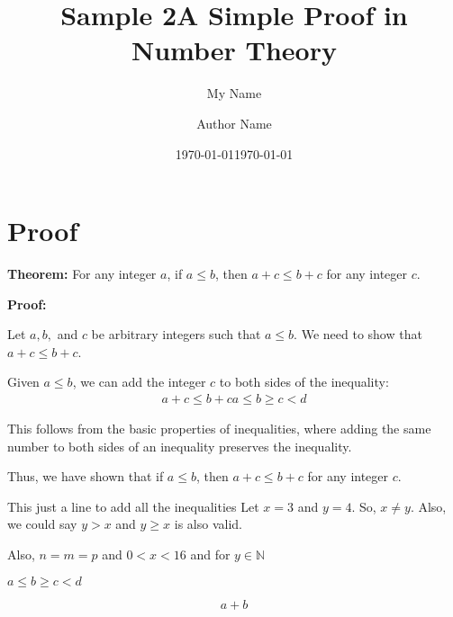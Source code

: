 \documentclass{article} %
\title{Sample 2} %
\author{My Name} %
\date{\today} %
\begin{document}
\title{A Simple Proof in Number Theory}
\author{Author Name}
\date{\today}
\maketitle

\section*{Proof}

\textbf{Theorem:} For any integer $a$, if $a \leq b$, then $a + c \leq b + c$ for any integer $c$.

\textbf{Proof:}

Let $a, b,$ and $c$ be arbitrary integers such that $a \leq b$. We need to show that $a + c \leq b + c$.

Given $a \leq b$, we can add the integer $c$ to both sides of the inequality:
\begin{equation}
    \begin{split}
        a + c \leq b + c
        a \leq b \geq c < d
    \end{split}
\end{equation}

This follows from the basic properties of inequalities, where adding the same number to both sides of an inequality preserves the inequality.

Thus, we have shown that if $a \leq b$, then $a + c \leq b + c$ for any integer $c$. \n

This just a line to add all the inequalities Let $x = 3$ and $y = 4$. So, $x \neq y$. Also, we could say $y > x$ and $y \geq x$ is also valid.

Also, $n = m = p$ and $0 < x < 16$ and for $ y \in \mathbb{N}$

$a \leq b \geq c < d$

$$a + b$$
\end{document}
